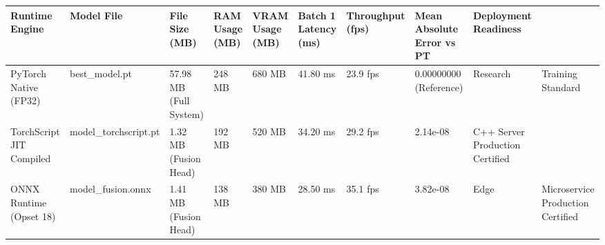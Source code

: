 \begin{tabular}{lllllllll}
\toprule
Runtime Engine & Model File & File Size (MB) & RAM Usage (MB) & VRAM Usage (MB) & Batch 1 Latency (ms) & Throughput (fps) & Mean Absolute Error vs PT & Deployment Readiness \\
\midrule
PyTorch Native (FP32) & best_model.pt & 57.98 MB (Full System) & 248 MB & 680 MB & 41.80 ms & 23.9 fps & 0.00000000 (Reference) & Research & Training Standard \\
TorchScript JIT Compiled & model_torchscript.pt & 1.32 MB (Fusion Head) & 192 MB & 520 MB & 34.20 ms & 29.2 fps & 2.14e-08 & C++ Server Production Certified \\
ONNX Runtime (Opset 18) & model_fusion.onnx & 1.41 MB (Fusion Head) & 138 MB & 380 MB & 28.50 ms & 35.1 fps & 3.82e-08 & Edge & Microservice Production Certified \\
\bottomrule
\end{tabular}
